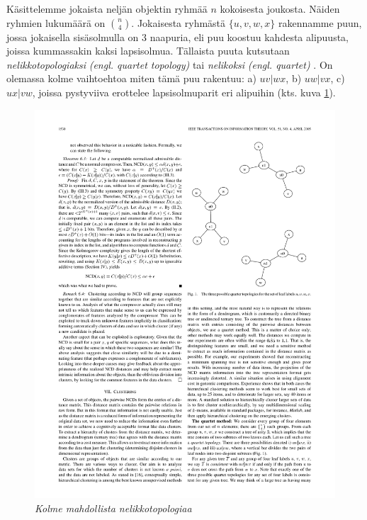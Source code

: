 \documentclass[12pt,finnish]{tktltiki2}
\theoremstyle{definition}
\theoremstyle{remark}
\newcommand{\engl}[1]{\emph{(engl. #1)}}
\begin{document}
    Käsittelemme jokaista neljän objektin ryhmää $n$ kokoisesta joukosta. Näiden ryhmien lukumäärä on $\binom{n}{4}$.
    Jokaisesta ryhmästä $\{u,v,w,x\}$ rakennamme puun, jossa jokaisella sisäsolmulla on 3 naapuria, eli puu koostuu kahdesta alipuusta, joissa kummassakin kaksi lapsisolmua.
    Tällaista puuta kutsutaan \emph{nelikkotopologiaksi} \engl{quartet topology} \cite{CV05} tai \emph{nelikoksi} \engl{quartet} \cite{10.1109/WDM.2004.1358107}.
    On olemassa kolme vaihtoehtoa miten tämä puu rakentuu: a) $uv|wx$, b) $uw|vx$, c) $ux|vw$, joissa pystyviiva erottelee lapsisolmuparit eri alipuihin (kts. kuva \ref{fig:ternary-tree}).

    \begin{figure}[tb]
      \immediate{}
      \includegraphics{img/ternary-tree}
      \caption{\emph{Kolme mahdollista nelikkotopologiaa}
      \cite{CV05}}
      \label{fig:ternary-tree}
    \end{figure}
\end{document}
